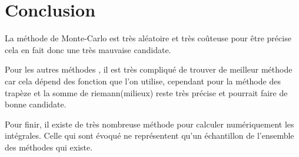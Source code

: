 \documentclass[a4paper,12pt]{article}
\begin{document}
\section{Conclusion}
La méthode de Monte-Carlo est très aléatoire et très coûteuse pour être précise cela en fait donc une très mauvaise candidate.

Pour les autres méthodes , il est très compliqué de trouver de meilleur méthode car cela dépend des fonction que l'on utilise, cependant pour la méthode des trapèze et la somme de riemann(milieux) reste très précise et pourrait faire de bonne candidate.

Pour finir, il existe de très nombreuse méthode pour calculer numériquement les intégrales. Celle qui sont évoqué ne représentent qu'un échantillon de l'ensemble des méthodes qui existe.

\listoffigures
\listofmyequations
\end{document}
